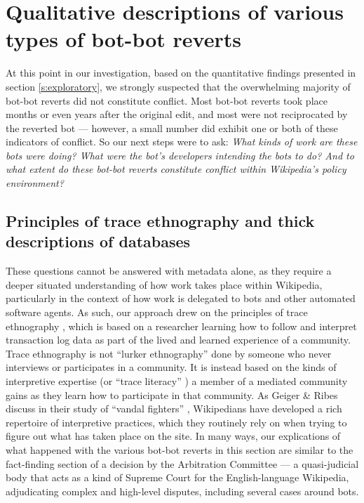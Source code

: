 \documentclass[format=acmsmall, review=false, screen=true]{acmart}%
\begin{document}
\section{Qualitative descriptions of various types of bot-bot reverts} \label{s:qualdesc}

At this point in our investigation, based on the quantitative findings presented in section \ref{s:exploratory}, we strongly suspected that the overwhelming majority of bot-bot reverts did not constitute conflict. Most bot-bot reverts took place months or even years after the original edit, and most were not reciprocated by the reverted bot --- however, a small number did exhibit one or both of these indicators of conflict. So our next steps were to ask: \textit{What kinds of work are these bots were doing? What were the bot's developers intending the bots to do? And to what extent do these bot-bot reverts constitute conflict within Wikipedia's policy environment?}

\subsection{Principles of trace ethnography and thick descriptions of databases} \label{s:exploratory:principles}

These questions cannot be answered with metadata alone, as they require a deeper situated understanding of how work takes place within Wikipedia, particularly in the context of how work is delegated to bots and other automated software agents. As such, our approach drew on the principles of trace ethnography \cite{Geiger2011}, which is based on a researcher learning how to follow and interpret transaction log data as part of the lived and learned experience of a community. Trace ethnography is not ``lurker ethnography'' done by someone who never interviews or participates in a community. It is instead based on the kinds of interpretive expertise (or ``trace literacy'' \cite{Ford2012}) a member of a mediated community gains as they learn how to participate in that community. As Geiger \& Ribes discuss in their study of ``vandal fighters'' \cite{Geiger2010}, Wikipedians have developed a rich repertoire of interpretive practices, which they routinely rely on when trying to figure out what has taken place on the site. In many ways, our explications of what happened with the various bot-bot reverts in this section are similar to the fact-finding section of a decision by the Arbitration Committee --- a quasi-judicial body that acts as a kind of Supreme Court for the English-language Wikipedia, adjudicating complex and high-level disputes, including several cases around bots.
\end{document}
